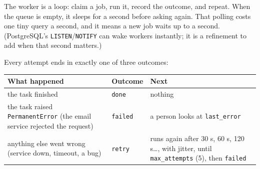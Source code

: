 \begin{codebox}
\begin{Shaded}
\begin{Highlighting}[]
\OperatorTok{{-}\textgreater{}} \NormalTok{:}
\OperatorTok{=}
\NormalTok{)  }
\NormalTok{)}
     


  \OperatorTok{==} \NormalTok{:}
\end{Highlighting}
\end{Shaded}

\end{codebox}

\noindent{}The worker is a loop: claim a job, run it, record the outcome, and repeat. When the queue is empty, it sleeps for a second before asking again. That polling costs one tiny query a second, and it means a new job waits up to a second. (PostgreSQL's \texttt{LISTEN}/\texttt{NOTIFY} can wake workers instantly; it is a refinement to add when that second matters.)

Every attempt ends in exactly one of three outcomes:


{\def\LTcaptype{none} %
\begin{longtable}[]{@{}
  >{\raggedright\arraybackslash}p{}
  >{\raggedright\arraybackslash}p{}
  >{\raggedright\arraybackslash}p{}@{}}
\toprule\noalign{}
\begin{minipage}[b]{\linewidth}\raggedright
What happened
\end{minipage} & \begin{minipage}[b]{\linewidth}\raggedright
Outcome
\end{minipage} & \begin{minipage}[b]{\linewidth}\raggedright
Next
\end{minipage} \\
\midrule\noalign{}
\endhead
\bottomrule\noalign{}
\endlastfoot
the task finished & \texttt{done} & nothing \\
the task raised \texttt{PermanentError} (the email service rejected the request) & \texttt{failed} & a person looks at \texttt{last\_error} \\
anything else went wrong (service down, timeout, a bug) & \texttt{retry} & runs again after 30 s, 60 s, 120 s\ldots, with jitter, until \texttt{max\_attempts} (5), then \texttt{failed} \\
\end{longtable}
}

